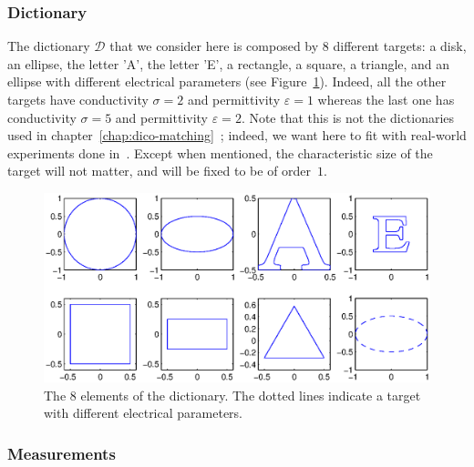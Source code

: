 \subsubsection{Dictionary}

The dictionary $\mathcal{D}$ that we consider here is composed by 8
different targets: a disk, an ellipse, the letter 'A', the letter
'E', a rectangle, a square, a triangle, and an ellipse with
different electrical parameters (see Figure~\ref{fig:dico}). Indeed,
all the other targets have conductivity $\sigma=2$ and
permittivity $\varepsilon=1$ whereas the last one has conductivity
$\sigma=5$ and permittivity $\varepsilon=2$. Note that this is not the 
dictionaries used in chapter~\ref{chap:dico-matching}~; indeed, we want
here to fit with real-world experiments done in~\cite{von1999active,gerhard,von2007distance}.
Except when
mentioned, the characteristic size of the target will not matter,
and will be fixed to be of order~$1$.

\begin{figure}[!h]
\centering\includegraphics[width=15cm]{pnas/dico}

\caption{\label{fig:dico}The 8 elements of the dictionary. The
dotted lines indicate a target with different electrical
parameters.}


\end{figure}



\subsubsection{Measurements}

